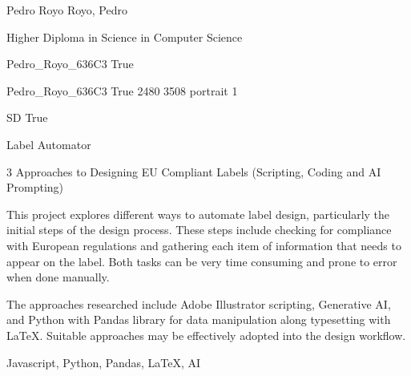 \documentclass[twoside]{report}
\begin{document}
\begingroup{}\relax



\def\Key{Pedro_Royo_636C3}

{Pedro Royo}
{Royo, Pedro}

{Higher Diploma in Science in Computer Science}

{Pedro_Royo_636C3}
{True}

{Pedro_Royo_636C3}
{True}
{2480}
{3508}
{portrait}
{1}

{SD}
{True}

{Label Automator}

{3 Approaches to Designing EU Compliant Labels (Scripting, Coding and AI Prompting)}

{This project explores different ways to automate label design, particularly the initial steps of the design process. These steps include checking for compliance with European regulations and gathering each item of information that needs to appear on the label. Both tasks can be very time consuming and prone to error when done manually. 

The approaches researched include Adobe Illustrator scripting, Generative AI, and Python with Pandas library for data manipulation along typesetting with LaTeX. Suitable approaches may be effectively adopted into the design workflow.}

{Javascript, Python, Pandas, LaTeX, AI}
\end{document}
